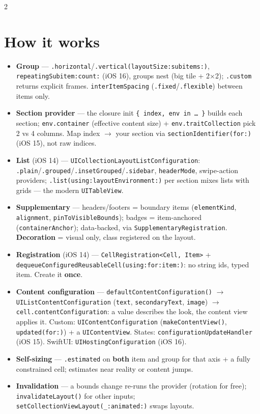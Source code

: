 \documentclass[8pt]{extarticle}
\begin{document}
\begin{multicols}{2}
\raggedright

\section{How it works}
\begin{itemize}
  \item \textbf{Group} — \texttt{.horizontal}/\texttt{.vertical(layoutSize:subitems:)},
        \texttt{repeatingSubitem:count:} (iOS 16), groups nest (big tile + 2×2);
        \texttt{.custom} returns explicit frames. \texttt{interItemSpacing}
        (\texttt{.fixed}/\texttt{.flexible}) between items only.
  \item \textbf{Section provider} — the closure init \texttt{\{ index, env in … \}}
        builds each section; \texttt{env.container} (effective content size) +
        \texttt{env.traitCollection} pick 2 vs 4 columns. Map index $\to$ your section
        via \texttt{sectionIdentifier(for:)} (iOS 15), not raw indices.
  \item \textbf{List} (iOS 14) — \texttt{UICollectionLayoutListConfiguration}:
        \texttt{.plain}/\texttt{.grouped}/\texttt{.insetGrouped}/\texttt{.sidebar},
        \texttt{headerMode}, swipe-action providers;
        \texttt{.list(using:layoutEnvironment:)} per section mixes lists with grids —
        the modern \texttt{UITableView}.
  \item \textbf{Supplementary} — headers/footers = boundary items (\texttt{elementKind},
        \texttt{alignment}, \texttt{pinToVisibleBounds}); badges = item-anchored
        (\texttt{containerAnchor}); data-backed, via \texttt{SupplementaryRegistration}.
        \textbf{Decoration} = visual only, class registered on the layout.
  \item \textbf{Registration} (iOS 14) — \texttt{CellRegistration<Cell, Item>} +
        \texttt{dequeueConfiguredReusableCell(using:for:item:)}: no string ids, typed
        item. Create it \textbf{once}.
  \item \textbf{Content configuration} — \texttt{defaultContentConfiguration()} $\to$
        \texttt{UIListContentConfiguration} (\texttt{text}, \texttt{secondaryText},
        \texttt{image}) $\to$ \texttt{cell.contentConfiguration}: a value describes the
        look, the content view applies it. Custom: \texttt{UIContentConfiguration}
        (\texttt{makeContentView()}, \texttt{updated(for:)}) + a \texttt{UIContentView}.
        States: \texttt{configurationUpdateHandler} (iOS 15). SwiftUI:
        \texttt{UIHostingConfiguration} (iOS 16).
  \item \textbf{Self-sizing} — \texttt{.estimated} on \textbf{both} item and group for
        that axis + a fully constrained cell; estimates near reality or content jumps.
  \item \textbf{Invalidation} — a bounds change re-runs the provider (rotation for
        free); \texttt{invalidateLayout()} for other inputs;
        \texttt{setCollectionViewLayout(\_:animated:)} swaps layouts.
\end{itemize}


\end{multicols}
\end{document}

